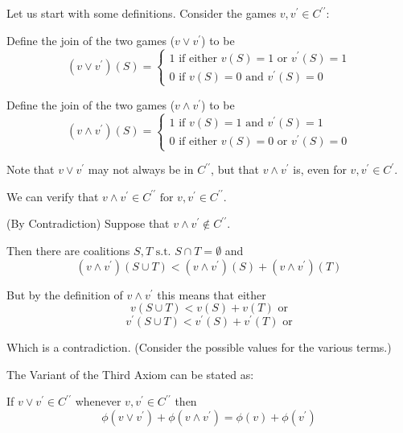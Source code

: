 \documentclass[
paper=128mm:96mm, %
fontsize=11pt, %
pagesize, %
parskip=half-, %
]{scrartcl} %
\theoremstyle{mythmstyle} %
\begin{document}
Let us start with some definitions. Consider the games $v, v^{\prime} \in C^{\prime\prime}$:

Define the join of the two games ($v \vee v^{\prime}$) to be
\[(v \vee v^{\prime})(S) = \begin{cases}
                             1 \text{ if either } v(S) = 1 \text{ or } v^{\prime}(S) = 1 \\
                             0 \text{ if } v(S) = 0 \text{ and } v^{\prime}(S) = 0
                             \end{cases} \]

Define the join of the two games ($v \wedge v^{\prime}$) to be
\[(v \wedge v^{\prime})(S) = \begin{cases}
                             1 \text{ if } v(S) = 1 \text{ and } v^{\prime}(S) = 1 \\
                             0 \text{ if either } v(S) = 0 \text{ or } v^{\prime}(S) = 0
                             \end{cases} \]
                             
Note that $v \vee v^{\prime}$ may not always be in $C^{\prime\prime}$, but that $v \wedge v^{\prime}$ is, even for $v, v^{\prime} \in C^{\prime}$.
                             
\clearpage

We can verify that $v \wedge v^{\prime} \in C^{\prime\prime} \text{ for } v, v^{\prime} \in C^{\prime\prime}$.

(By Contradiction) Suppose that $v \wedge v^{\prime} \not\in C^{\prime\prime}$.

Then there are coalitions $S, T \text{ s.t. } S \cap T = \emptyset$ and
	\[ (v \wedge v^{\prime})(S \cup T) < (v \wedge v^{\prime})(S) + (v \wedge v^{\prime})(T) \]
    
But by the definition of $v \wedge v^{\prime}$ this means that either
	\[ v(S \cup T) < v(S) + v(T) \text{ or} \]
	\[ v^{\prime}(S \cup T) < v^{\prime}(S) + v^{\prime}(T) \text{ or} \]
    
Which is a contradiction. (Consider the possible values for the various terms.)
    
\clearpage

The Variant of the Third Axiom can be stated as:

If $v \vee v^{\prime} \in C^{\prime\prime}$ whenever $v, v^{\prime} \in C^{\prime\prime}$ then
\[ \phi(v \vee v^{\prime}) + \phi(v \wedge v^{\prime}) = \phi(v) + \phi(v^{\prime}) \]
\end{document}
